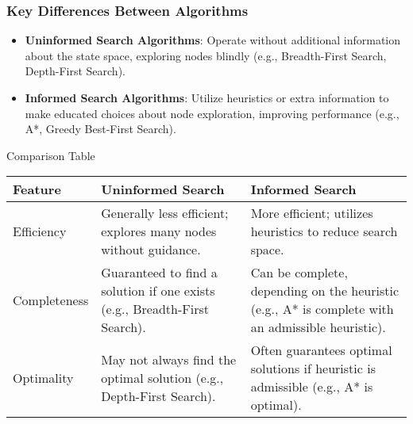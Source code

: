 \documentclass[aspectratio=169]{beamer}
\begin{document}
\begin{frame}[fragile]
    \frametitle{Key Differences Between Algorithms}
    \begin{itemize}
        \item \textbf{Uninformed Search Algorithms}: Operate without additional information about the state space, exploring nodes blindly (e.g., Breadth-First Search, Depth-First Search).
        
        \item \textbf{Informed Search Algorithms}: Utilize heuristics or extra information to make educated choices about node exploration, improving performance (e.g., A*, Greedy Best-First Search).
    \end{itemize}
    
    \begin{block}{Comparison Table}
        \begin{tabular}{|l|l|l|}
            \hline
            \textbf{Feature} & \textbf{Uninformed Search} & \textbf{Informed Search} \\
            \hline
            Efficiency & Generally less efficient; explores many nodes without guidance. & More efficient; utilizes heuristics to reduce search space. \\
            \hline
            Completeness & Guaranteed to find a solution if one exists (e.g., Breadth-First Search). & Can be complete, depending on the heuristic (e.g., A* is complete with an admissible heuristic). \\
            \hline
            Optimality & May not always find the optimal solution (e.g., Depth-First Search). & Often guarantees optimal solutions if heuristic is admissible (e.g., A* is optimal). \\
            \hline
        \end{tabular}
    \end{block}
\end{frame}
\end{document}
